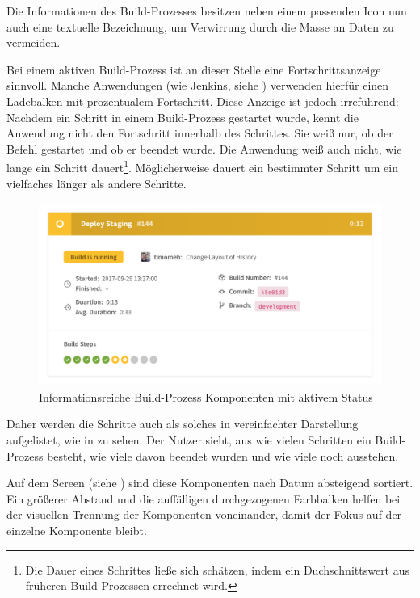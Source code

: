 Die Informationen des Build-Prozesses besitzen neben einem passenden Icon nun auch eine textuelle Bezeichnung, um Verwirrung durch die Masse an Daten zu vermeiden.

Bei einem aktiven Build-Prozess ist an dieser Stelle eine Fortschrittsanzeige sinnvoll. Manche Anwendungen (wie Jenkins, siehe ) verwenden hierfür einen Ladebalken mit prozentualem Fortschritt. Diese Anzeige ist jedoch irreführend: Nachdem ein Schritt in einem Build-Prozess gestartet wurde, kennt die Anwendung nicht den Fortschritt innerhalb des Schrittes. Sie weiß nur, ob der Befehl gestartet und ob er beendet wurde. Die Anwendung weiß auch nicht, wie lange ein Schritt dauert\footnote{Die Dauer eines Schrittes ließe sich schätzen, indem ein Duchschnittswert aus früheren Build-Prozessen errechnet wird.}. Möglicherweise dauert ein bestimmter Schritt um ein vielfaches länger als andere Schritte.

\begin{figure}[h]
  \caption{Informationsreiche Build-Prozess Komponenten mit aktivem Status}
  \label{fig:build-process-detail-active}
  \centering
    \includegraphics[width=\textwidth]{assets/build-detail-active}
\end{figure}

Daher werden die Schritte auch als solches in vereinfachter Darstellung aufgelistet, wie in  zu sehen. Der Nutzer sieht, aus wie vielen Schritten ein Build-Prozess besteht, wie viele davon beendet wurden und wie viele noch ausstehen.

Auf dem Screen (siehe ) sind diese Komponenten nach Datum absteigend sortiert. Ein größerer Abstand und die auffälligen durchgezogenen Farbbalken helfen bei der visuellen Trennung der Komponenten voneinander, damit der Fokus auf der einzelne Komponente bleibt.

